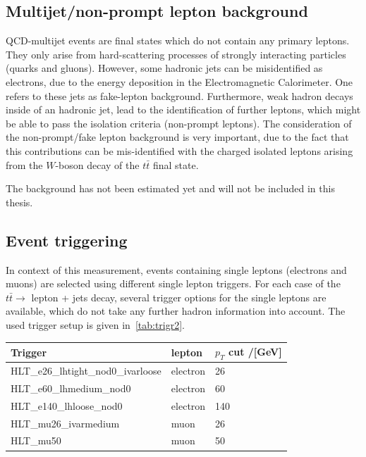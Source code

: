 \subsection{Multijet/non-prompt lepton background}
QCD-multijet events are final states which do not contain any primary leptons. They only arise from hard-scattering processes of strongly interacting particles (quarks and gluons). However, some hadronic jets can be misidentified as electrons, due to the energy deposition in the Electromagnetic Calorimeter. One refers to these jets as fake-lepton background. Furthermore, weak hadron decays inside of an hadronic jet, lead to the identification of further leptons, which might be able to pass the isolation criteria (non-prompt leptons).
The consideration of the non-prompt/fake lepton background is very important, due to the fact that this contributions can be mis-identified with the charged isolated leptons arising from the $W$-boson decay of the $t\bar{t}$ final state.

The background has not been estimated yet and will not be included in this thesis.
 
 

 \subsection{Event triggering}
 In context of this measurement, events containing single leptons (electrons and muons) are selected using different single lepton triggers.
 For each case of the $t\bar{t} \rightarrow$ lepton + jets decay, several  trigger options for the single leptons are available, which do not take any further hadron information into account. The used trigger setup is given in~\cref{tab:trigr2}.
 

 \begin{center}
 	\label{tab:trigr2}
 	
 	
 	
 	\vspace{0.3cm}	
 	
 	
 	\begin{tabular}{>{}m{7.0cm}>{}m{3.0cm}>{}m{3.0cm}} \toprule
 			Trigger&  lepton&$p_T$ cut /[GeV]\\
 			\midrule
 		
 		HLT\_e26\_lhtight\_nod0\_ivarloose& electron&  26\\
 		HLT\_e60\_lhmedium\_nod0  & electron&  60 \\
 		HLT\_e140\_lhloose\_nod0& electron &140\\
		HLT\_mu26\_ivarmedium & muon & 26\\
		HLT\_mu50 & muon & 50\\
 	

 		
 		\bottomrule
 	\end{tabular}
 	
 \end{center}
 
